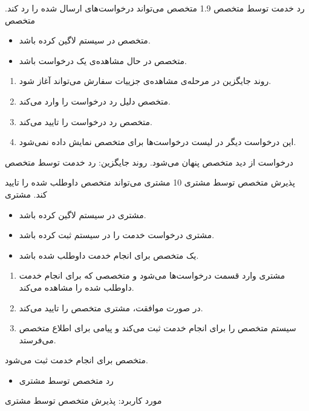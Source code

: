 \alternativeflow
{
	رد خدمت توسط متخصص
}
{1.9}
{
	متخصص می‌تواند درخواست‌های ارسال شده را رد کند.
}
{
	متخصص
}
{}
{
	\begin{itemize}
		\vspace*{-0.6cm}
		\item 
		متخصص در سیستم لاگین کرده باشد.
		\item
		متخصص در حال مشاهده‌ی یک درخواست باشد.
	\end{itemize}
}
{
	\vspace*{-0.6cm}
	\begin{enumerate}
		\item 
		روند جایگزین در مرحله‌ی مشاهده‌ی جزییات سفارش می‌تواند آغاز شود.
		\item
		متخصص دلیل رد درخواست را وارد می‌کند.
		\item
		متخصص رد درخواست را تایید می‌کند.
		\item
		این درخواست دیگر در لیست درخواست‌ها برای متخصص نمایش داده نمی‌شود.
	\end{enumerate}
}
{
	درخواست از دید متخصص پنهان می‌شود.
}
{
روند جایگزین: رد خدمت توسط متخصص
}


\usecase
{پذیرش متخصص توسط مشتری}
{10}
{مشتری می‌تواند متخصص داوطلب شده را تایید کند.}
{مشتری}
{}
{	
	\begin{itemize}
		\vspace*{-0.6cm}
		\item 
		مشتری در سیستم لاگین کرده باشد.
		\item
		مشتری درخواست خدمت را در سیستم ثبت کرده باشد.
		\item
		یک متخصص برای انجام خدمت داوطلب شده باشد.
	\end{itemize}
}
{
	\vspace*{-0.6cm}
	\begin{enumerate}
		\item 
		مشتری وارد قسمت درخواست‌ها می‌شود و متخصصی که برای انجام خدمت داوطلب شده را مشاهده می‌کند.
		\item 
		در صورت موافقت، مشتری متخصص را تایید می‌کند.
		\item 
		سیستم متخصص را برای انجام خدمت ثبت می‌کند و پیامی برای اطلاع متخصص می‌فرستد.
	\end{enumerate}
}
{متخصص برای انجام خدمت ثبت می‌شود.}
{
	\begin{itemize}
		\vspace*{-0.6cm}
		\item
		رد متخصص توسط مشتری
	\end{itemize}
}
{
	مورد کاربرد: پذیرش متخصص توسط مشتری
}

